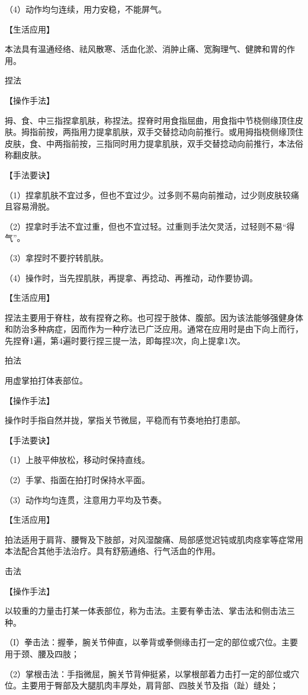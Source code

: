 \documentclass[12pt,UTF8]{ctexbook}
\begin{document}
（4）动作均匀连续，用力安稳，不能屏气。

【生活应用】

本法具有温通经络、祛风散寒、活血化淤、消肿止痛、宽胸理气、健脾和胃的作用。

捏法

【操作手法】

拇、食、中三指捏拿肌肤，称捏法。捏脊时用食指屈曲，用食指中节桡侧缘顶住皮肤。拇指前按，两指用力提拿肌肤，双手交替捻动向前推行。或用拇指桡侧缘顶住皮肤，食、中两指前按，三指同时用力提拿肌肤，双手交替捻动向前推行，本法俗称翻皮肤。

【手法要诀】

（1）捏拿肌肤不宜过多，但也不宜过少。过多则不易向前推动，过少则皮肤较痛且容易滑脱。

（2）捏拿时手法不宜过重，但也不宜过轻。过重则手法欠灵活，过轻则不易“得气”。

（3）拿捏时不要拧转肌肤。

（4）操作时，当先捏肌肤，再提拿、再捻动、再推动，动作要协调。

【生活应用】

捏法主要用于脊柱，故有捏脊之称。也可捏于肢体、腹部。因为该法能够强健身体和防治多种病症，因而作为一种疗法已广泛应用。通常在应用时是由下向上而行，先捏脊1遍，第4遍时要行捏三提一法，即每捏3次，向上提拿1次。

拍法

用虚掌拍打体表部位。

【操作手法】

操作时手指自然并拢，掌指关节微屈，平稳而有节奏地拍打患部。

【手法要诀】

（1）上肢平伸放松，移动时保持直线。

（2）手掌、指面在拍打时保持水平面。

（3）动作均匀连贯，注意用力平均及节奏。

【生活应用】

拍法适用于肩背、腰臀及下肢部，对风湿酸痛、局部感觉迟钝或肌肉痉挛等症常用本法配合其他手法治疗。具有舒筋通络、行气活血的作用。

击法

【操作手法】

以较重的力量击打某一体表部位，称为击法。主要有拳击法、掌击法和侧击法三种。

（I）拳击法：握拳，腕关节伸直，以拳背或拳侧缘击打一定的部位或穴位。主要用于颈、腰及四肢；

（2）掌根击法：手指微屈，腕关节背伸挺紧，以掌根部着力击打一定的部位或穴位。主要用于臀部及大腿肌肉丰厚处，肩背部、四肢关节及指（趾）缝处；
\end{document}
